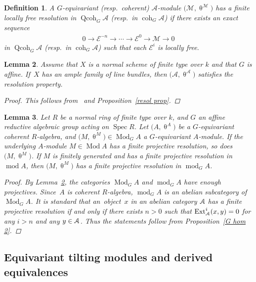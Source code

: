 \documentclass[pdftex]{sigma}%
\newtheorem{dfn}{Definition}[section]
\newtheorem{lem}[dfn]{Lemma}
\numberwithin{equation}{section}
\newcommand{\Spec}{\operatorname{Spec}}
\newcommand{\Ext}{\operatorname{Ext}}
\newcommand{\coh}{\operatorname{coh}}
\newcommand{\Qcoh}{\operatorname{Qcoh}}
\newcommand{\Mod}{\operatorname{Mod}}
\newcommand{\fmod}{\operatorname{mod}}
\newcommand{\cA}{\mathcal{A}}
\newcommand{\cE}{\mathcal{E}}
\newcommand{\cM}{\mathcal{M}}
\newcommand{\scrA}{\EuScript{A}}
\begin{document}
\begin{dfn}
A $G$-equivariant (resp.\ coherent) $\cA$-module $\big(\cM,\uptheta^{\cM}\big)$ has a {\it finite locally free resolution} in $\Qcoh_G\cA$ (resp.\ in $\coh_G\cA$) if there exists an exact sequence
\begin{gather*}
0\to \cE^{-n}\to\cdots\to\cE^0\to \cM\to0
\end{gather*}
in $\Qcoh_G\cA$ (resp.\ in $\coh_G\cA$) such that each $\cE^i$ is locally free.
\end{dfn}


\begin{lem}\label{enough proj}
Assume that $X$ is a normal scheme of finite type over $k$ and that $G$ is affine.
If~$X$ has an ample family of line bundles, then $\big(\cA,\uptheta^{\cA}\big)$ satisfies the resolution property.
\begin{proof}
This follows from~\cite[Theorem~2.29]{bfk} and Proposition~\ref{resol prop}.
\end{proof}
\end{lem}

\begin{lem}\label{finite proj resol}
Let $R$ be a normal ring of finite type over $k$, and $G$ an affine reductive algebraic group acting on $\Spec R$. Let $\big(A,\uptheta^{A}\big)$ be a $G$-equivariant coherent $R$-algebra, and $\big(M,\uptheta^M\big)\in \Mod_GA$ a $G$-equivariant $A$-module. If the underlying $A$-module $M\in \Mod A$ has a finite projective resolution, so does $\big(M,\uptheta^M\big)$. If $M$ is finitely generated and has a finite projective resolution in $\fmod A$, then $\big(M,\uptheta^M\big)$ has a finite projective resolution in $\fmod_GA$.
\begin{proof}
By Lemma~\ref{enough proj}, the categories $\Mod_GA$ and $\fmod_GA$ have enough projectives. Since~$A$ is coherent $R$-algebra, $\fmod_GA$ is an abelian subcategory of $\Mod_GA$. It is standard that an~object~$x$ in an abelian category $\scrA$ has a finite projective resolution if and only if there exists $n>0$ such that $\Ext_{\scrA}^i(x,y)=0$ for any $i>n$ and any $y\in \scrA$. Thus the statements follow from Proposition~\ref{G hom 2}.
\end{proof}
\end{lem}

\subsection{Equivariant tilting modules and derived equivalences}\label{derived section}
\end{document}
